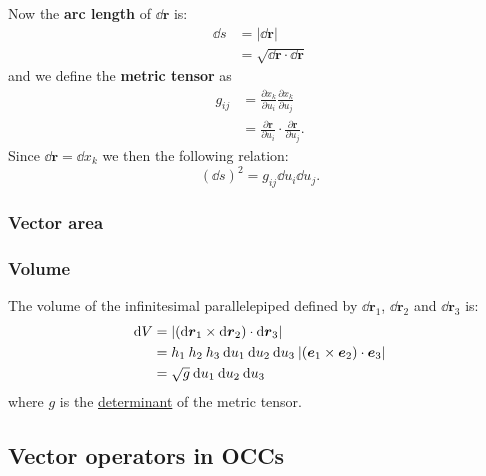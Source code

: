 \documentclass{article}
\begin{document}
Now the \textbf{arc length} of $\dd\boldsymbol{r}$ is:
\begin{align*}
    \dd s
    &=|\dd\boldsymbol{r}| \\
    &=\sqrt{\dd\boldsymbol{r}\cdot\dd\boldsymbol{r}}
\end{align*}
and we define the \textbf{metric tensor} as
\begin{align*}
    g_{ij}
    &=\frac{\partial x_k}{\partial u_i}\frac{\partial x_k}{\partial u_j} \\
    &=\frac{\partial\boldsymbol{r}}{\partial u_i}
    \cdot\frac{\partial\boldsymbol{r}}{\partial u_j}.
\end{align*}
Since $\dd\boldsymbol{r}=\dd x_k$ we then the following relation:
$$(\dd s)^2=g_{ij}\dd u_i\dd u_j.$$

\newpage

\subsubsection{Vector area}

\subsubsection{Volume}
The volume of the infinitesimal parallelepiped defined by
$\dd\boldsymbol{r}_1$, $\dd\boldsymbol{r}_2$ and $\dd\boldsymbol{r}_3$ is:
\begin{align*}
    \dd V
    &=|(\dd\boldsymbol{r}_1\times\dd\boldsymbol{r}_2)
    \cdot\dd\boldsymbol{r}_3| \\
    &=h_1\hspace{0.03in}h_2\hspace{0.03in}h_3\hspace{0.03in}
    \dd u_1\hspace{0.03in}\dd u_2\hspace{0.03in}\dd u_3\hspace{0.03in}
    |(\boldsymbol{e}_1\times\boldsymbol{e}_2)
    \cdot\boldsymbol{e}_3| \\
    &=\sqrt{g}\hspace{0.03in}
    \dd u_1\hspace{0.03in}\dd u_2\hspace{0.03in}\dd u_3\hspace{0.03in}
\end{align*}
where $g$ is the \underline{determinant} of the metric tensor.

\newpage

\subsection{Vector operators in OCCs}
\end{document}
